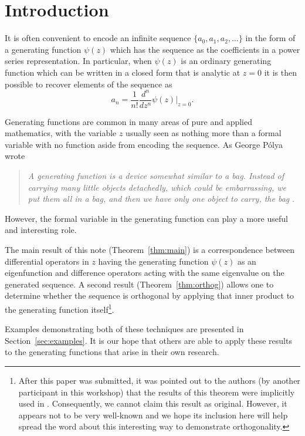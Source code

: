 \documentclass{amsart}
\theoremstyle{definition}
\theoremstyle{remark}
\numberwithin{equation}{section}
\begin{document}
\section{Introduction}

It is often convenient to encode an infinite sequence
 $\{a_0,a_1,a_2,\ldots\}$ in the form of a generating function
 $\psi(z)$ which has the sequence as the coefficients in a power
 series representation.
 In particular, when $\psi(z)$ is an ordinary generating function
 which can be written in a closed form that is
 analytic at $z=0$ it is then possible to recover elements of the
 sequence as
 $$
 a_n=\frac{1}{n!}\frac{d^n}{dz^n}\psi(z)\bigg|_{z=0}.
 $$
 
Generating functions are common in many areas of pure and
 applied mathematics, with the variable $z$ usually seen as nothing more
 than a formal variable with no function aside from encoding the sequence.  As George P\'olya wrote

 \medskip
 
 \begin{quote}
\textit{A generating function is a device somewhat similar to a bag. Instead of carrying many little objects detachedly, which could be embarrassing, we put them all in a bag, and then we have only one object to carry, the bag}
\cite{Polya}.
\end{quote}

 \medskip

\noindent
However, the formal variable in the generating function can play
a more useful and interesting role.

The main result of this note (Theorem~\ref{thm:main}) is a correspondence between differential
operators in $z$ having the generating function $\psi(z)$ as an eigenfunction
and difference operators acting with the same eigenvalue on the
generated sequence.  A second result (Theorem~\ref{thm:orthog})
allows one to determine whether the sequence is orthogonal by applying
that inner product to the generating function itself\footnote{After
  this paper was submitted, it was pointed out to the authors (by
  another participant in this workshop) that the results of this
  theorem were implicitly used in \cite{usedit}.  Consequently, we
  cannot claim this result as original.  However, it appears not to be
  very well-known and we hope its inclusion here will help spread the
  word about this interesting way to demonstrate orthogonality.}.

Examples demonstrating both of these techniques are presented in
Section~\ref{sec:examples}.  It is our hope
that others are able to apply these results to the generating
functions that arise in their own research.
\end{document}
